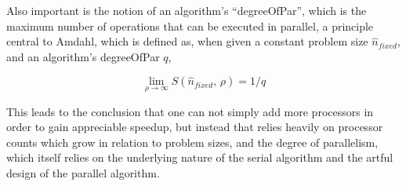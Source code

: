 Also important is the notion of an algorithm's ``\gls{degreeOfPar}'', which is the maximum number of operations that can be executed in parallel, a principle central to \gls{Amdahl}, which is defined as, when given a constant problem size $\hat{n}_{fixed}$, and an algorithm's \gls{degreeOfPar} $q$,

\begin{equation}
	\lim_{\rho \to \infty} \mathit{S}(\hat{n}_{fixed},\,\rho) = 1 / q
\end{equation}

This leads to the conclusion that one can not simply add more processors in order to gain appreciable speedup, but instead that relies heavily on processor counts which grow in relation to problem sizes, and the degree of parallelism, which itself relies on the underlying nature of the serial algorithm and the artful design of the parallel algorithm.






